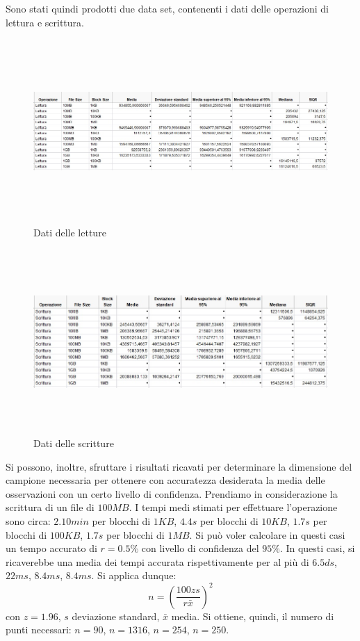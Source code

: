 		Sono stati quindi prodotti due data set, contenenti i dati delle operazioni di lettura e scrittura.
		\begin{figure}[H]
			\centering
			\includegraphics[width=18cm, height= 7cm]{./immagine/letture.jpg}
			\caption{Dati delle letture}
			\label{fig:b-r}
		\end{figure}
		\begin{figure}[H]
			\centering
			\includegraphics[width=18cm, height=7cm]{./immagine/scritture.jpg}
			\caption{Dati delle scritture}
			\label{fig:b-w}
		\end{figure}
		Si possono, inoltre, sfruttare i risultati ricavati per determinare la dimensione del campione necessaria per ottenere con accuratezza desiderata la media delle osservazioni con un certo livello di confidenza. Prendiamo in considerazione la scrittura di un file di $100MB$. I tempi medi stimati per effettuare l'operazione sono circa: $2.10min$ per blocchi di $1KB$, $4.4s$ per blocchi di $10KB$, $1.7s$ per blocchi di $100KB$, $1.7s$ per blocchi di $1MB$. Si può voler calcolare in questi casi un tempo accurato di $r=0.5\%$ con livello di confidenza del $95\%$. In questi casi, si ricaverebbe una media dei tempi accurata rispettivamente per al più di $6.5ds$, $22ms$, $8.4ms$, $8.4ms$. Si applica dunque:
		\begin{equation}
			n=\left( \frac{100zs}{r\bar{x}}\right) ^{2}
		\end{equation}
		con $z=1.96$, $s$ deviazione standard, $\bar{x}$ media. Si ottiene, quindi, il numero di punti necessari: $n=90$, $n=1316$, $n=254$, $n=250$.
